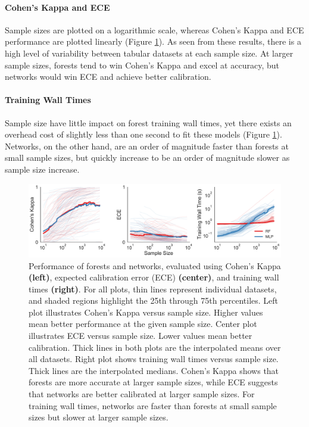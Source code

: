 \paragraph{Cohen's Kappa and ECE}
Sample sizes are plotted on a logarithmic scale, whereas Cohen's Kappa and ECE performance are plotted linearly (Figure \ref{fig:tab}). As seen from these results, there is a high level of variability between tabular datasets at each sample size. At larger sample sizes, forests tend to win Cohen's Kappa and excel at accuracy, but networks would win ECE and achieve better calibration.

\paragraph{Training Wall Times}
Sample size have little impact on forest training wall times, yet there exists an overhead cost of slightly less than one second to fit these models (Figure \ref{fig:tab}). Networks, on the other hand, are an order of magnitude faster than forests at small sample sizes, but quickly increase to be an order of magnitude slower as sample size increase.

\begin{figure}[htb]
\centering
\includegraphics[width=1.0\textwidth]{figures/cc18}
  \caption{Performance of forests and networks, evaluated using Cohen's Kappa \textbf{(left)}, expected calibration error (ECE) \textbf{(center)}, and training wall times \textbf{(right)}. 
  For all plots, thin lines represent individual datasets, and shaded regions highlight the 25th through 75th percentiles. Left plot illustrates Cohen's Kappa versus sample size. Higher values mean better performance at the given sample size. Center plot illustrates ECE versus sample size. Lower values mean better calibration. Thick lines in both plots are the interpolated means over all datasets. Right plot shows training wall times versus sample size. Thick lines are the interpolated medians. 
  Cohen's Kappa shows that forests are more accurate at larger sample sizes, while ECE suggests that networks are better calibrated at larger sample sizes. For training wall times, networks are faster than forests at small sample sizes but slower at larger sample sizes.
  }
\label{fig:tab}
\end{figure}

